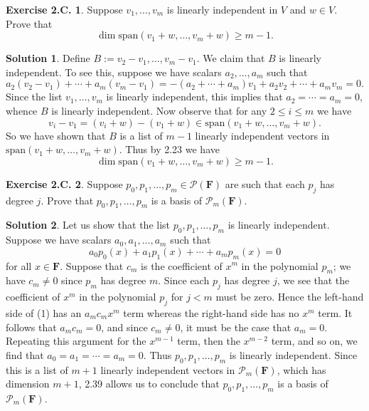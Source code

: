 \documentclass[12pt]{article}
\theoremstyle{definition}
\theoremstyle{exercise}
\newtheorem{exercise}{Exercise 2.C.}
\theoremstyle{solution}
\newtheorem*{solution}{Solution}
\newcommand{\poly}{\mathcal{P}}
\newcommand{\Span}{\text{span}}
\newcommand{\F}{\mathbf{F}}
\begin{document}
\begin{exercise}
\label{ex:9}
    Suppose \( v_1, \ldots, v_m \) is linearly independent in \( V \) and \( w \in V \). Prove that
    \[
        \dim \Span(v_1 + w, \ldots, v_m + w) \geq m - 1.
    \]
\end{exercise}

\begin{solution}
    Define \( B := v_2 - v_1, \ldots, v_m - v_1 \). We claim that \( B \) is linearly independent. To see this, suppose we have scalars \( a_2, \ldots, a_m \) such that
    \[
        a_2 (v_2 - v_1) + \cdots + a_m (v_m - v_1) = -(a_2 + \cdots + a_m) v_1 + a_2 v_2 + \cdots + a_m v_m = 0.
    \]
    Since the list \( v_1, \ldots, v_m \) is linearly independent, this implies that \( a_2 = \cdots = a_m = 0 \), whence \( B \) is linearly independent. Now observe that for any \( 2 \leq i \leq m \) we have
    \[
        v_i - v_1 = (v_i + w) - (v_1 + w) \in \Span(v_1 + w, \ldots, v_m + w).
    \]
    So we have shown that \( B \) is a list of \( m - 1 \) linearly independent vectors in \( \Span(v_1 + w, \ldots, v_m + w) \). Thus by 2.23 we have
    \[
        \dim \Span(v_1 + w, \ldots, v_m + w) \geq m - 1.
    \]
\end{solution}

\begin{exercise}
\label{ex:10}
    Suppose \( p_0, p_1, \ldots, p_m \in \poly(\F) \) are such that each \( p_j \) has degree \( j \). Prove that \( p_0, p_1, \ldots, p_m \) is a basis of \( \poly_m(\F) \).
\end{exercise}

\begin{solution}
    Let us show that the list \( p_0, p_1, \ldots, p_m \) is linearly independent. Suppose we have scalars \( a_0, a_1, \ldots, a_m \) such that
    \begin{equation}
        a_0 p_0(x) + a_1 p_1(x) + \cdots + a_m p_m(x) = 0
    \end{equation}
    for all \( x \in \F \). Suppose that \( c_m \) is the coefficient of \( x^m \) in the polynomial \( p_m \); we have \( c_m \neq 0 \) since \( p_m \) has degree \( m \). Since each \( p_j \) has degree \( j \), we see that the coefficient of \( x^m \) in the polynomial \( p_j \) for \( j < m \) must be zero. Hence the left-hand side of (1) has an \( a_m c_m x^m \) term whereas the right-hand side has no \( x^m \) term. It follows that \( a_m c_m = 0 \), and since \( c_m \neq 0 \), it must be the case that \( a_m = 0 \). Repeating this argument for the \( x^{m-1} \) term, then the \( x^{m-2} \) term, and so on, we find that \( a_0 = a_1 = \cdots = a_m = 0 \). Thus \( p_0, p_1, \ldots, p_m \) is linearly independent. Since this is a list of \( m + 1 \) linearly independent vectors in \( \poly_m(\F) \), which has dimension \( m + 1 \), 2.39 allows us to conclude that \( p_0, p_1, \ldots, p_m \) is a basis of \( \poly_m(\F) \).
\end{solution}
\end{document}
